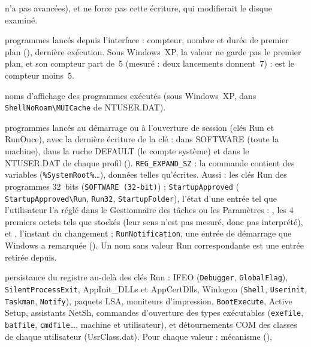 \documentclass[11pt,a4paper,oneside]{report}
\begin{document}
\begin{description}[style=nextline,leftmargin=1.2em]
        n'a pas avancées), et \wac{} ne force pas cette écriture, qui
        modifierait le disque examiné.
  \item[\fichier{userassists.json}] programmes lancés depuis l'interface :
        compteur, nombre et durée de premier plan (),
        dernière exécution. Sous Windows~XP, la valeur ne garde pas le premier
        plan, et son compteur part de~5 (mesuré : deux lancements donnent~7) :
         est le compteur moins~5.
  \item[\fichier{muicache.json}] noms d'affichage des programmes exécutés
        (sous Windows~XP, dans \texttt{ShellNoRoam\textbackslash MUICache} de
        NTUSER.DAT).
  \item[\fichier{run.json}] programmes lancés au démarrage ou à l'ouverture de
        session (clés Run et RunOnce), avec la dernière écriture de la clé : dans
        SOFTWARE (toute la machine), dans la ruche DEFAULT (le compte système) et
        dans le NTUSER.DAT de chaque profil (). 
        \texttt{REG\_EXPAND\_SZ} : la commande contient des variables
        (\texttt{\%SystemRoot\%}\ldots), données telles qu'écrites. Aussi :
        les clés Run des programmes 32~bits (\texttt{SOFTWARE (32-bit)}) ;
        \texttt{StartupApproved} ( \texttt{StartupApproved\textbackslash Run},
        \texttt{Run32}, \texttt{StartupFolder}), l'état d'une entrée tel que
        l'utilisateur l'a réglé dans le Gestionnaire des tâches ou les Paramètres :
        , les 4 premiers octets tels que stockés (leur sens n'est pas
        mesuré, donc pas interprété), et , l'instant du
        changement ; \texttt{RunNotification}, une entrée de démarrage que Windows
        a remarquée (). Un nom sans valeur Run correspondante
        est une entrée retirée depuis.
  \item[\fichier{persistence.json}] persistance du registre au-delà des clés
        Run : IFEO (\texttt{Debugger}, \texttt{GlobalFlag}), \texttt{SilentProcessExit},
        AppInit\_DLLs et AppCertDlls, Winlogon (\texttt{Shell},
        \texttt{Userinit}, \texttt{Taskman}, \texttt{Notify}), paquets LSA,
        moniteurs d'impression, \texttt{BootExecute}, Active Setup, assistants
        NetSh, commandes d'ouverture des types exécutables (\texttt{exefile},
        \texttt{batfile}, \texttt{cmdfile}\ldots, machine et utilisateur), et
        détournements COM des classes de chaque utilisateur (UsrClass.dat). Pour chaque valeur : mécanisme (),

\end{description}
\end{document}
